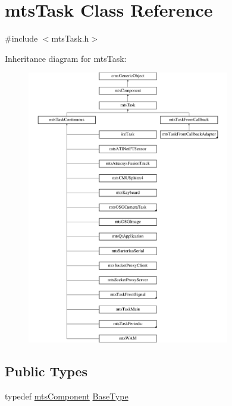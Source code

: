 \hypertarget{classmts_task}{}\section{mts\+Task Class Reference}
\label{classmts_task}


{\ttfamily \#include $<$mts\+Task.\+h$>$}

Inheritance diagram for mts\+Task\+:\begin{figure}[H]
\begin{center}
\leavevmode
\includegraphics[height=12.000000cm]{d6/d82/classmts_task}
\end{center}
\end{figure}
\subsection*{Public Types}
\begin{DoxyCompactItemize}
\item 
typedef \hyperlink{classmts_component}{mts\+Component} \hyperlink{classmts_task_aac1f3b293b0dc04205b449899c795b80}{Base\+Type}
\end{DoxyCompactItemize}
